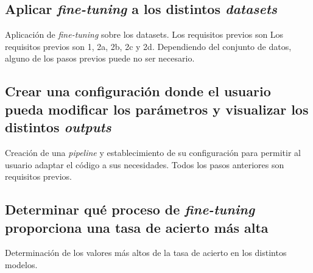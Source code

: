 \subsection{Aplicar \textit{fine-tuning} a los distintos \textit{datasets}}

Aplicación de \textit{fine-tuning} sobre los datasets. Los requisitos previos son  Los requisitos previos son 1, 2a, 2b, 2c y 2d. Dependiendo del conjunto de datos, alguno de los pasos previos puede no ser necesario.

\subsection{Crear una configuración donde el usuario pueda modificar los parámetros y visualizar los distintos \textit{outputs}}

Creación de una \textit{pipeline} y establecimiento de su configuración para permitir al usuario adaptar el código a sus necesidades. Todos los pasos anteriores son requisitos previos.

\subsection{Determinar qué proceso de \textit{fine-tuning} proporciona una tasa de acierto más alta}

Determinación de los valores más altos de la tasa de acierto en los distintos modelos.



